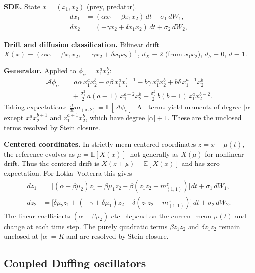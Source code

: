 \documentclass{article}
\newcommand{\E}{\mathbb{E}}
\theoremstyle{definition}
\begin{document}
\textbf{SDE.}
State $x = (x_1, x_2)$ (prey, predator).
\begin{align}
    dx_1 &= (\alpha x_1 - \beta x_1 x_2)\, dt + \sigma_1\, dW_1,
    \nonumber\\
    dx_2 &= (-\gamma x_2 + \delta x_1 x_2)\, dt + \sigma_2\, dW_2,
\end{align}

\textbf{Drift and diffusion classification.}
Bilinear drift $X(x) = (\alpha x_1 - \beta x_1 x_2,\;
-\gamma x_2 + \delta x_1 x_2)^\top$,
$d_X = 2$ (from $x_1 x_2$), $d_h = 0$, $\bar{d} = 1$.

\textbf{Generator.}
Applied to $\phi_\alpha = x_1^a x_2^b$:
\begin{align}
    \mathcal{A}\phi_\alpha
    &= a\alpha\, x_1^{a} x_2^{b}
    - a\beta\, x_1^{a} x_2^{b+1}
    - b\gamma\, x_1^{a} x_2^{b}
    + b\delta\, x_1^{a+1} x_2^{b}
    \nonumber\\
    &\quad
    + \frac{\sigma_1^2}{2}\, a(a{-}1)\, x_1^{a-2} x_2^{b}
    + \frac{\sigma_2^2}{2}\, b(b{-}1)\, x_1^{a} x_2^{b-2}.
\end{align}
Taking expectations: $\frac{d}{dt}m_{(a,b)} = \E[\mathcal{A}\phi_\alpha]$.
All terms yield moments of degree $|\alpha|$ except
$x_1^{a} x_2^{b+1}$ and $x_1^{a+1} x_2^{b}$, which have
degree $|\alpha| + 1$. These are the unclosed terms resolved
by Stein closure.

\textbf{Centered coordinates.}
In strictly mean-centered coordinates $z=x-\mu(t)$, the reference evolves
as $\dot{\mu}=\E[X(x)]$, not generally as $X(\mu)$ for nonlinear drift.
Thus the centered drift is $X(z+\mu)-\E[X(x)]$ and has zero expectation.
For Lotka--Volterra this gives
\begin{align}
    dz_1 &= \bigl[(\alpha - \beta\mu_2) z_1 - \beta\mu_1 z_2
           - \beta (z_1 z_2 - m^z_{(1,1)})\bigr]\, dt + \sigma_1\, dW_1,
    \nonumber\\
    dz_2 &= \bigl[\delta\mu_2 z_1 + (-\gamma + \delta\mu_1) z_2
           + \delta (z_1 z_2 - m^z_{(1,1)})\bigr]\, dt + \sigma_2\, dW_2.
\end{align}
The linear coefficients $(\alpha - \beta\mu_2)$ etc.\ depend on
the current mean $\mu(t)$ and change at each time step.
The purely quadratic terms $\beta z_1 z_2$ and $\delta z_1 z_2$
remain unclosed at $|\alpha| = K$ and are resolved by Stein closure.

\subsection{Coupled Duffing oscillators}
\end{document}
